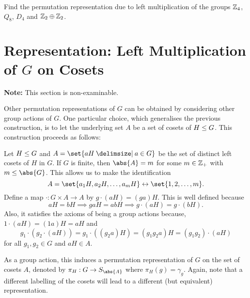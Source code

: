 \documentclass[11pt]{penrose}
\begin{document}
\begin{nex}
    Find the permutation representation due to left multiplication of the groups $\mathbb{Z}_{4}$, $Q_{8}$, $D_{4}$ and $\mathbb{Z}_{2} \oplus \mathbb{Z}_{2}$.
\end{nex}

\section{Representation: Left Multiplication of \texorpdfstring{$G$}{G} on Cosets}

\textbf{Note:} This section is non-examinable.

Other permutation representations of $G$ can be obtained by considering other group actions of $G$. One particular choice, which generalises the previous construction, is to let the underlying set $A$ be a set of cosets of $H \mathrel{\leq} G$. This construction proceeds as follows:

Let $H \mathrel{\leq} G$ and $A = \set{aH \st a \in G}$ be the set of distinct left cosets of $H$ in $G$. If $G$ is finite, then $\abs{A} = m$ for some $m \in \mathbb{Z}_{+}$ with $m \leq \abs{G}$. This allows us to make the identification
\begin{equation*}
    A = \set{a_{1}H, a_{2}H, \dots, a_{m}H} \leftrightarrow \set{1, 2, \dots, m}.
\end{equation*}
Define a map $\cdot : G \times A \to A$ by $g \cdot (aH) = (ga)H$. This is well defined because
\begin{equation*}
    aH = bH
    \implies gaH = abH
    \implies g \cdot (aH) = g \cdot (bH).
\end{equation*}
Also, it satisfies the axioms of being a group actions because, $1 \cdot (aH) = (1a) H = aH$ and
\begin{equation*}
    g_{1} \cdot (g_{2} \cdot (aH))
    = g_{1} \cdot ((g_{2}a) H) 
    = (g_{1}g_{2}a) H
    = (g_{1}g_{2}) \cdot (aH)
\end{equation*}
for all $g_{1}, g_{2} \in G$ and $aH \in A$.

As a group action, this induces a permutation representation of $G$ on the set of cosets $A$, denoted by $\pi_{H} : G \to S_{\abs{A}}$ where $\pi_{H}(g) = \gamma_{g}$. Again, note that a different labelling of the cosets will lead to a different (but equivalent) representation.
\end{document}
